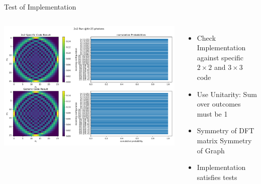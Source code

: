 \begin{frame}{Test of Implementation}
%
\begin{columns}[t]
	\vspace{-20pt}
	\begin{center}
	\includegraphics[width=\linewidth]{./gfx/compExact-K2}
	\end{center}

	\begin{itemize}
	\item Check Implementation against specific $2 \times 2$ and $3 \times 3$ code
	\item Use Unitarity: Sum over outcomes must be 1
	\item Symmetry of DFT matrix \Thus Symmetry of Graph
	\item Implementation satisfies tests
	\end{itemize}
\end{columns}
%
\end{frame}


